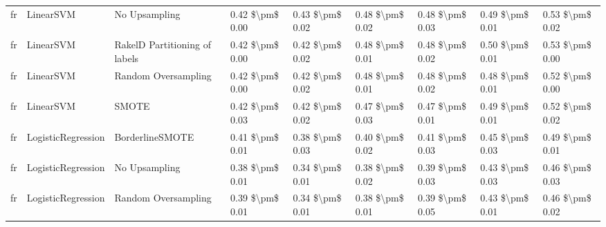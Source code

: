 \begin{tabular}{lllllllll}
      fr &                       LinearSVM &                 No Upsampling & 0.42 \$\textbackslash pm\$ 0.00 &           0.43 \$\textbackslash pm\$ 0.02 &       0.48 \$\textbackslash pm\$ 0.02 &        0.48 \$\textbackslash pm\$ 0.03 &                         0.49 \$\textbackslash pm\$ 0.01 &     0.53 \$\textbackslash pm\$ 0.02 \\
      fr &                       LinearSVM & RakelD Partitioning of labels & 0.42 \$\textbackslash pm\$ 0.00 &           0.42 \$\textbackslash pm\$ 0.02 &       0.48 \$\textbackslash pm\$ 0.01 &        0.48 \$\textbackslash pm\$ 0.02 &                         0.50 \$\textbackslash pm\$ 0.01 &     0.53 \$\textbackslash pm\$ 0.00 \\
      fr &                       LinearSVM &           Random Oversampling & 0.42 \$\textbackslash pm\$ 0.00 &           0.42 \$\textbackslash pm\$ 0.02 &       0.48 \$\textbackslash pm\$ 0.01 &        0.48 \$\textbackslash pm\$ 0.02 &                         0.48 \$\textbackslash pm\$ 0.01 &     0.52 \$\textbackslash pm\$ 0.00 \\
      fr &                       LinearSVM &                         SMOTE & 0.42 \$\textbackslash pm\$ 0.03 &           0.42 \$\textbackslash pm\$ 0.02 &       0.47 \$\textbackslash pm\$ 0.03 &        0.47 \$\textbackslash pm\$ 0.01 &                         0.49 \$\textbackslash pm\$ 0.01 &     0.52 \$\textbackslash pm\$ 0.02 \\
      fr &              LogisticRegression &               BorderlineSMOTE & 0.41 \$\textbackslash pm\$ 0.01 &           0.38 \$\textbackslash pm\$ 0.03 &       0.40 \$\textbackslash pm\$ 0.02 &        0.41 \$\textbackslash pm\$ 0.03 &                         0.45 \$\textbackslash pm\$ 0.03 &     0.49 \$\textbackslash pm\$ 0.01 \\
      fr &              LogisticRegression &                 No Upsampling & 0.38 \$\textbackslash pm\$ 0.01 &           0.34 \$\textbackslash pm\$ 0.01 &       0.38 \$\textbackslash pm\$ 0.02 &        0.39 \$\textbackslash pm\$ 0.03 &                         0.43 \$\textbackslash pm\$ 0.03 &     0.46 \$\textbackslash pm\$ 0.03 \\
      fr &              LogisticRegression &           Random Oversampling & 0.39 \$\textbackslash pm\$ 0.01 &           0.34 \$\textbackslash pm\$ 0.01 &       0.38 \$\textbackslash pm\$ 0.01 &        0.39 \$\textbackslash pm\$ 0.05 &                         0.43 \$\textbackslash pm\$ 0.01 &     0.46 \$\textbackslash pm\$ 0.02 \\

\end{tabular}
